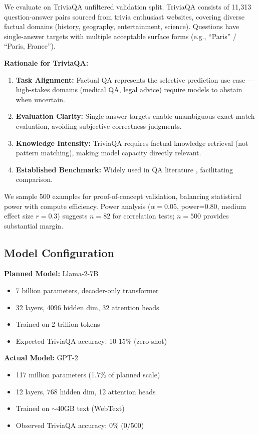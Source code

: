 We evaluate on TriviaQA \citep{Joshi2017} unfiltered validation split. TriviaQA consists of 11,313 question-answer pairs sourced from trivia enthusiast websites, covering diverse factual domains (history, geography, entertainment, science). Questions have single-answer targets with multiple acceptable surface forms (e.g., ``Paris'' / ``Paris, France'').

\textbf{Rationale for TriviaQA:}
\begin{enumerate}
\item \textbf{Task Alignment:} Factual QA represents the selective prediction use case --- high-stakes domains (medical QA, legal advice) require models to abstain when uncertain.
\item \textbf{Evaluation Clarity:} Single-answer targets enable unambiguous exact-match evaluation, avoiding subjective correctness judgments.
\item \textbf{Knowledge Intensity:} TriviaQA requires factual knowledge retrieval (not pattern matching), making model capacity directly relevant.
\item \textbf{Established Benchmark:} Widely used in QA literature \citep{Roberts2020,Petroni2019}, facilitating comparison.
\end{enumerate}

We sample 500 examples for proof-of-concept validation, balancing statistical power with compute efficiency. Power analysis ($\alpha=0.05$, power=0.80, medium effect size $r=0.3$) suggests $n=82$ for correlation tests; $n=500$ provides substantial margin.

\subsection{Model Configuration}

\textbf{Planned Model:} Llama-2-7B \citep{Touvron2023}
\begin{itemize}
\item 7 billion parameters, decoder-only transformer
\item 32 layers, 4096 hidden dim, 32 attention heads
\item Trained on 2 trillion tokens
\item Expected TriviaQA accuracy: 10-15\% (zero-shot)
\end{itemize}

\textbf{Actual Model:} GPT-2 \citep{Radford2019}
\begin{itemize}
\item 117 million parameters (1.7\% of planned scale)
\item 12 layers, 768 hidden dim, 12 attention heads
\item Trained on $\sim$40GB text (WebText)
\item Observed TriviaQA accuracy: 0\% (0/500)
\end{itemize}

